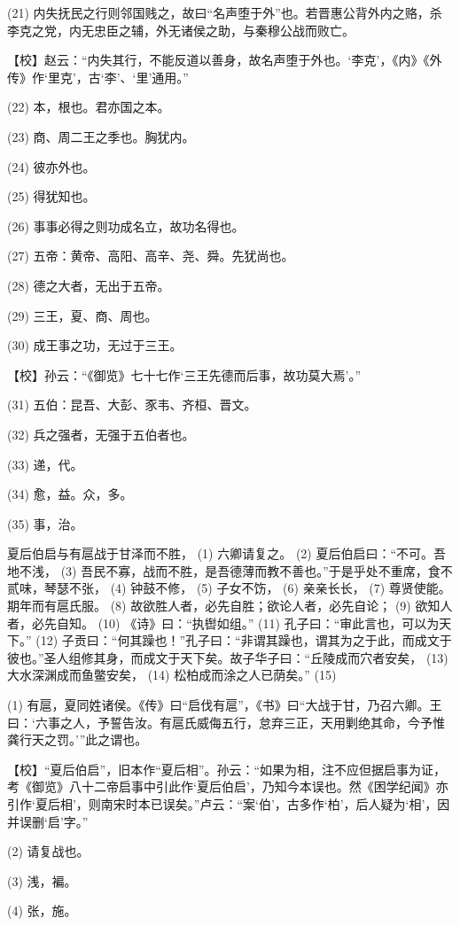 \documentclass[12pt,UTF8]{ctexbook}
\begin{document}
(21) 内失抚民之行则邻国贱之，故曰“名声堕于外”也。若晋惠公背外内之赂，杀李克之党，内无忠臣之辅，外无诸侯之助，与秦穆公战而败亡。

【校】赵云：“内失其行，不能反道以善身，故名声堕于外也。‘李克’，《内》《外传》作‘里克’，古‘李’、‘里’通用。”

(22) 本，根也。君亦国之本。

(23) 商、周二王之季也。胸犹内。

(24) 彼亦外也。

(25) 得犹知也。

(26) 事事必得之则功成名立，故功名得也。

(27) 五帝：黄帝、高阳、高辛、尧、舜。先犹尚也。

(28) 德之大者，无出于五帝。

(29) 三王，夏、商、周也。

(30) 成王事之功，无过于三王。

【校】孙云：“《御览》七十七作‘三王先德而后事，故功莫大焉’。”

(31) 五伯：昆吾、大彭、豕韦、齐桓、晋文。

(32) 兵之强者，无强于五伯者也。

(33) 递，代。

(34) 愈，益。众，多。

(35) 事，治。

夏后伯启与有扈战于甘泽而不胜， (1) 六卿请复之。 (2) 夏后伯启曰：“不可。吾地不浅， (3) 吾民不寡，战而不胜，是吾德薄而教不善也。”于是乎处不重席，食不贰味，琴瑟不张， (4) 钟鼓不修， (5) 子女不饬， (6) 亲亲长长， (7) 尊贤使能。期年而有扈氏服。 (8) 故欲胜人者，必先自胜；欲论人者，必先自论； (9) 欲知人者，必先自知。 (10) 《诗》曰：“执辔如组。” (11) 孔子曰：“审此言也，可以为天下。” (12) 子贡曰：“何其躁也！”孔子曰：“非谓其躁也，谓其为之于此，而成文于彼也。”圣人组修其身，而成文于天下矣。故子华子曰：“丘陵成而穴者安矣， (13) 大水深渊成而鱼鳖安矣， (14) 松柏成而涂之人已荫矣。” (15)

(1) 有扈，夏同姓诸侯。《传》曰“启伐有扈”，《书》曰“大战于甘，乃召六卿。王曰：‘六事之人，予誓告汝。有扈氏威侮五行，怠弃三正，天用剿绝其命，今予惟龚行天之罚。’”此之谓也。

【校】“夏后伯启”，旧本作“夏后相”。孙云：“如果为相，注不应但据启事为证，考《御览》八十二帝启事中引此作‘夏后伯启’，乃知今本误也。然《困学纪闻》亦引作‘夏后相’，则南宋时本已误矣。”卢云：“案‘伯’，古多作‘柏’，后人疑为‘相’，因并误删‘启’字。”

(2) 请复战也。

(3) 浅，褊。

(4) 张，施。
\end{document}
